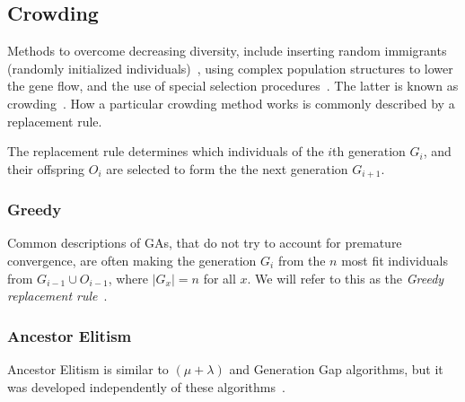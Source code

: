 \subsection{Crowding}\label{sec:replacementrules}
Methods to overcome decreasing diversity, include inserting random immigrants (randomly initialized individuals)~\cite{Cobb93geneticalgorithms}, using complex population structures to lower the gene flow, and the use of special selection procedures~\cite{ursem2002diversity}. The latter is known as crowding~\cite{DeJong:1975:ABC:907087}. How a particular crowding method works is commonly described by a replacement rule.

The replacement rule determines which individuals of the $i$th generation $G_i$,
and their offspring $O_i$ are selected to form the the next generation $G_{i+1}$.

\subsubsection{Greedy}
Common descriptions of GAs, that do not try to account for premature convergence,
are often making the generation $G_i$ from the $n$ most fit individuals from $G_{i-1} \cup O_{i-1}$, where $\lvert G_x \rvert = n$ for all $x$. We will refer to this as the \emph{Greedy replacement rule}~\cite{masterThesisGANN}.

%
%

\subsubsection{Ancestor Elitism}
Ancestor Elitism is similar to $(\mu + \lambda)$ and Generation Gap algorithms, but it was developed independently of these algorithms~\cite[p. 34, p. 50]{Luke2013Metaheuristics}.

